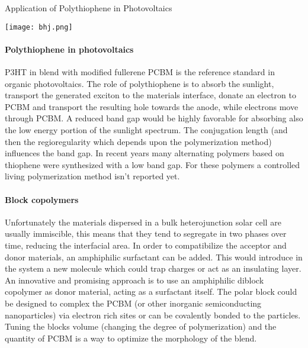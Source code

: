 \begin{section}{Application of Polythiophene in Photovoltaics}
\begin{SCfigure}[][tbp]%
\centering
\texttt{[image: bhj.png]}
\caption{Structure of a bulk heterojunction solar cell.}
\label{fig:bhj}
\end{SCfigure}

\paragraph{Polythiophene in photovoltaics} \Gls{P3HT} in blend with modified fullerene \gls{PCBM} is the reference standard in organic photovoltaics. The role of polythiophene is to absorb the sunlight, transport the generated exciton to the materials interface, donate an electron to \gls{PCBM} and transport the resulting hole towards the anode, while electrons move through \gls{PCBM}. 
A reduced band gap would be highly favorable for absorbing also the low energy portion of the sunlight spectrum. The conjugation length (and then the regioregularity which depends upon the polymerization method) influences the band gap. In recent years many alternating polymers based on thiophene were synthesized with a low band gap. For these polymers a controlled living polymerization method isn't reported yet.

\paragraph{Block copolymers} Unfortunately the materials dispersed in a bulk heterojunction solar cell are usually immiscible, this means that they tend to segregate in two phases over time, reducing the inter\-facial area. In order to compatibilize the acceptor and donor materials, an amphiphilic surfactant can be added. 
This would introduce in the system a new molecule which could trap charges or act as an insulating layer. An innovative and promising approach is to use an amphiphilic diblock copolymer as donor material, acting as a surfactant itself. The polar block could be designed to complex the \gls{PCBM} (or other inorganic semiconducting nano\-particles) via electron rich sites or can be covalently bonded to the particles. Tuning the blocks volume (changing the degree of polymerization) and the quantity of \gls{PCBM} is a way to optimize the morphology of the blend. 

\end{section}